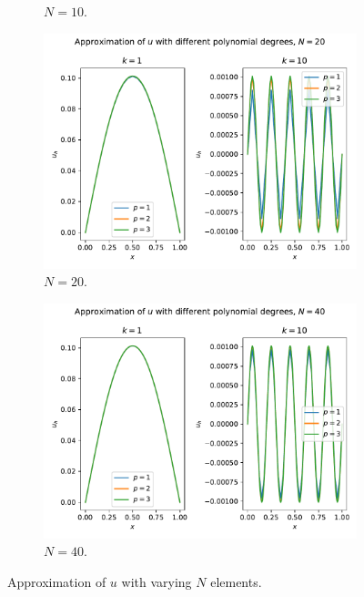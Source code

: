 \begin{solution}
\begin{figure}
\begin{subfigure}[b]{0.45\textwidth}
            \caption{$N=10$.\label{fig:ex4_2}}
        \end{subfigure}
        \begin{subfigure}[b]{0.45\textwidth}
            \includegraphics[width=\textwidth]{1_glimpse/exercise_1_4_N=20.pdf}
            \caption{$N=20$.\label{fig:ex4_3}}
        \end{subfigure}
        \hfill
        \begin{subfigure}[b]{0.45\textwidth}
            \includegraphics[width=\textwidth]{1_glimpse/exercise_1_4_N=40.pdf}
            \caption{$N=40$.\label{fig:ex4_4}}
        \end{subfigure}
        \caption{Approximation of $u$ with varying $N$ elements.\label{fig:ex4}}
    \end{figure}
\end{solution}